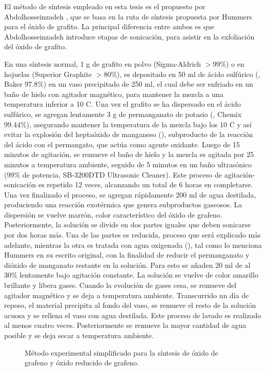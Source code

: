 El método de síntesis empleado en esta tesis es el propuesto por Abdolhosseinzadeh \citep{Abdolhosseinzadeh2015}, que se basa en la ruta de síntesis propuesta por Hummers para el óxido de grafito. La principal diferencia entre ambos es que Abdolhosseinzadeh introduce etapas de sonicación, para asistir en la exfoliación del óxido de grafito.

En una síntesis normal, 1 g de grafito en polvo (Sigma-Aldrich $>$99\%) o en hojuelas (Superior Graphite $>$80\%), es depositado en 50 ml de ácido sulfúrico (, Baker 97.8\%) en un vaso precipitado de 250 ml, el cual debe ser enfriado en un baño de hielo con agitador magnético, para mantener la mezcla a una temperatura inferior a 10 \degree C. Una vez el grafito se ha dispersado en el ácido sulfúrico, se agregan lentamente 3 g de permanganato de potasio (, Chemix 99.44\%), asegurando mantener la temperatura de la mezcla bajo los 10 C y así evitar la explosión del heptaóxido de manganeso (), subproducto de la reacción del ácido con el permangato, que actúa como agente oxidante\citep{Dreyer2010}. Luego de 15 minutos de agitación, se remueve el baño de hielo y la mezcla es agitada por 25 minutos a temperatura ambiente, seguido de 5 minutos en un baño ultrasónico (99\% de potencia, SB-3200DTD Ultrasonic Cleaner). Este proceso de agitación-sonicación es repetido 12 veces, alcanzando un total de 6 horas en completarse. Una vez finalizado el proceso, se agregan rápidamente 200 ml de agua destilada, produciendo una reacción exotérmica que genera subproductos gaseosos. La dispersión se vuelve marrón, color característico del óxido de grafeno. Posteriormente, la solución se divide en dos partes iguales que deben sonicarse por dos horas más. Una de las partes es reducida, proceso que será explicado más adelante, mientras la otra es tratada con agua oxigenada (), tal como lo menciona Hummers en su escrito original, con la finalidad de reducir el permanganato y dióxido de manganato restante en la solución. Para esto se añaden 20 ml de  al 30\% lentamente bajo agitación constante. La solución se vuelve de color amarillo brillante y libera gases. Cuando la evolución de gases cesa, se remueve del agitador magnético y se deja a temperatura ambiente. Transcurrido un día de reposo, el material precipita al fondo del vaso, se remueve el resto de la solución acuosa y se rellena el vaso con agua destilada. Este proceso de lavado es realizado al menos cuatro veces. Posteriormente se remueve la mayor cantidad de agua posible y se deja secar a temperatura ambiente.

\begin{figure}
	\centering
	\caption[Método experimental simplicado para la síntesis de óxido de grafeno y óxido reduxido de grafeno]{Método experimental simplificado para la síntesis de óxido de grafeno y óxido reducido de grafeno.}
\end{figure}



